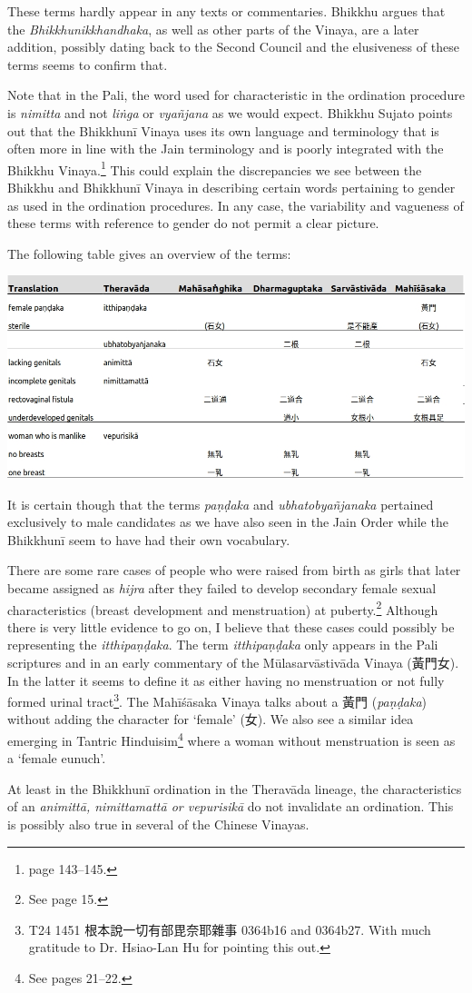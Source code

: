 These terms hardly appear in any texts or commentaries. Bhikkhu \cite{sujato2009} argues that the {\em Bhikkhunikkhandhaka}, as well as other parts of the Vinaya, are a later addition, possibly dating back to the Second Council and the elusiveness of these terms seems to confirm that. 

Note that in the Pali, the word used for characteristic in the ordination procedure is {\em nimitta} and not {\em liṅga} or {\em vyañ­jana} as we would expect. Bhikkhu Sujato points out that the Bhikkhunī Vinaya uses its own language and terminology that is often more in line with the Jain terminology and is poorly integrated with the Bhikkhu Vinaya.\footnote{\cite{sujato2009} page 143–145.} This could explain the discrepancies we see between the Bhikkhu and Bhikkhunī Vinaya in describing certain words pertaining to gender as used in the ordination procedures. In any case, the variability and vagueness of these terms with reference to gender do not permit a clear picture. 

The following table gives an overview of the terms:

\bigskip
\includegraphics[width=\linewidth]{female.jpg}
\label{female}

It is certain though that the terms {\em paṇḍaka} and {\em ubhatob­yañ­janaka} pertained exclusively to male candidates as we have also seen in the Jain Order while the Bhikkhunī seem to have had their own vocabulary.

There are some rare cases of people who were raised from birth as girls that later became assigned as {\em hijra} after they failed to develop secondary female sexual characteristics (breast development and menstruation) at puberty.\footnote{See \cite{nanda} page 15.} Although there is very little evidence to go on, I believe that these cases could possibly be representing the {\em itthipaṇḍaka}. The term {\em itthipaṇḍaka} only appears in the Pali scriptures and in an early commentary of the Mūlasarvāstivāda Vinaya (黃門女). In the latter it seems to define it as either having no menstruation or not fully formed urinal tract\footnote{T24 1451 根本說一切有部毘奈耶雜事 0364b16 and 0364b27. With much gratitude to Dr. Hsiao-Lan Hu for pointing this out.}. The Mahīśāsaka Vinaya talks about a 黃門 ({\em paṇḍaka}) without adding the character for `female' (女). We also see a similar idea emerging in Tantric Hinduisim\footnote{See \cite{nanda} pages 21–22.} where a woman without menstruation is seen as a `female eunuch'.

At least in the Bhikkhunī ordination in the Theravāda lineage, the characteristics of an {\em animittā, nimittamattā or vepurisikā} do not invalidate an ordination. This is possibly also true in several of the Chinese Vinayas.
